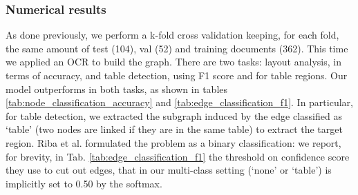 \documentclass[runningheads]{llncs}
\begin{document}
\subsubsection{Numerical results}
As done previously, we perform a k-fold cross validation keeping, for each fold, the same amount of test (104), val (52) and training documents (362). This time we applied an OCR to build the graph. There are two tasks: layout analysis, in terms of accuracy, and table detection, using F1 score and  for table regions. Our model outperforms \cite{riba2019table} in both tasks, as shown in tables \ref{tab:node_classification_accuracy} and \ref{tab:edge_classification_f1}. In particular, for table detection, we extracted the subgraph induced by the edge classified as `table' (two nodes are linked if they are in the same table) to extract the target region. Riba et al. \cite{riba2019table} formulated the problem as a binary classification: we report, for brevity, in Tab. \ref{tab:edge_classification_f1} the threshold on confidence score they use to cut out edges, that in our multi-class setting (`none' or `table') is implicitly set to 0.50 by the softmax.

\begin{table}[b]
    \centering
    \caption{\textbf{Layout analysis results on RVL-CDIP Invoices}. Layout analysis accuracy scores depicted in terms of node classification task.}
    \label{tab:node_classification_accuracy}
\end{table}
\end{document}
